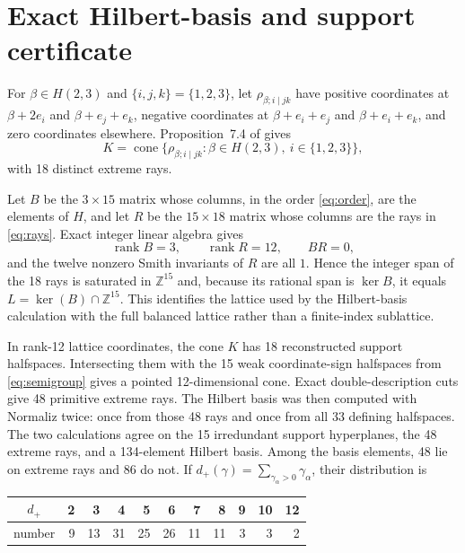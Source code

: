 \documentclass[11pt]{article}
\theoremstyle{definition}
\begin{document}
\section{Exact Hilbert-basis and support certificate}

For $\beta\in H(2,3)$ and $\{i,j,k\}=\{1,2,3\}$, let
$\rho_{\beta;i\mid jk}$ have positive coordinates at
$\beta+2e_i$ and $\beta+e_j+e_k$, negative coordinates at
$\beta+e_i+e_j$ and $\beta+e_i+e_k$, and zero coordinates elsewhere.
Proposition~7.4 of \cite{BathijaRohatgiSoskin2026} gives
\begin{equation}\label{eq:rays}
 K=\operatorname{cone}\{\rho_{\beta;i\mid jk}:
       \beta\in H(2,3),\ i\in\{1,2,3\}\},
\end{equation}
with 18 distinct extreme rays.

Let $B$ be the $3\times15$ matrix whose columns, in the order
\eqref{eq:order}, are the elements of $H$, and let $R$ be the
$15\times18$ matrix whose columns are the rays in \eqref{eq:rays}.  Exact
integer linear algebra gives
\[
 \operatorname{rank}B=3,\qquad \operatorname{rank}R=12,
 \qquad BR=0,
\]
and the twelve nonzero Smith invariants of $R$ are all $1$.  Hence the
integer span of the 18 rays is saturated in $\mathbb Z^{15}$ and, because
its rational span is $\ker B$, it equals $L=\ker(B)\cap\mathbb Z^{15}$.
This identifies the lattice used by the Hilbert-basis calculation with the
full balanced lattice rather than a finite-index sublattice.

In rank-12 lattice coordinates, the cone $K$ has 18 reconstructed support
halfspaces.  Intersecting them with the 15 weak coordinate-sign halfspaces
from \eqref{eq:semigroup} gives a pointed 12-dimensional cone.  Exact
double-description cuts give 48 primitive extreme rays.  The Hilbert basis
was then computed with Normaliz \cite{BrunsIchim2010,Normaliz} twice: once
from those 48 rays and once from all 33 defining halfspaces.  The two
calculations agree on the 15 irredundant support hyperplanes, the 48 extreme
rays, and a 134-element Hilbert basis.  Among the basis elements, 48 lie on
extreme rays and 86 do not.  If
$d_+(\gamma)=\sum_{\gamma_\alpha>0}\gamma_\alpha$, their distribution is
\begin{center}
\small
\begin{tabular}{c@{\quad}rrrrrrrrrr}
\toprule
$d_+$&2&3&4&5&6&7&8&9&10&12\\
\midrule
number&9&13&31&25&26&11&11&3&3&2\\
\bottomrule
\end{tabular}
\end{center}
\end{document}
